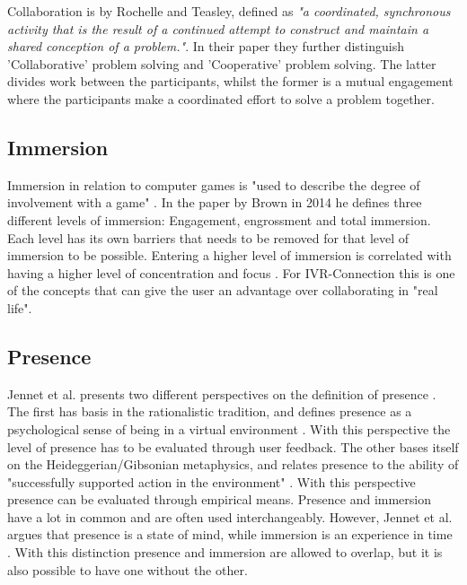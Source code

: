             Collaboration is by Rochelle and Teasley, defined as \emph{"a coordinated, synchronous activity that is the result of a continued attempt to construct and maintain a shared conception of a problem."}\cite{Roschelle1995}. In their paper they further distinguish 'Collaborative' problem solving and 'Cooperative' problem solving. The latter divides work between the participants, whilst the former is a mutual engagement where the participants make a coordinated effort to solve a problem together. \cite{Roschelle1995}
            
        \subsection{Immersion} %
            Immersion in relation to computer games is "used to describe the degree of involvement with a game" \cite{Brown2004}. In the paper by Brown in 2014 he defines three different levels of immersion: Engagement, engrossment and total immersion. Each level has its own barriers that needs to be removed for that level of immersion to be possible. Entering a higher level of immersion is correlated with having a higher level of concentration and focus \cite{Jennett2008}. For IVR-Connection this is one of the concepts that can give the user an advantage over collaborating in "real life".
        
        \subsection{Presence} %
            Jennet et al. presents two different perspectives on the definition of presence \cite{Jennett2008}. The first has basis in the rationalistic tradition, and defines presence as a psychological sense of being in a virtual environment \cite{Slater1994}. With this perspective the level of presence has to be evaluated through user feedback. The other bases itself on the Heideggerian/Gibsonian metaphysics, and relates presence to the ability of "successfully supported action in the environment" \cite{Zahorik1998}. With this perspective presence can be evaluated through empirical means. Presence and immersion have a lot in common and are often used interchangeably. However, Jennet et al. argues that presence is a state of mind, while immersion is an experience in time \cite{Jennett2008}. With this distinction presence and immersion are allowed to overlap, but it is also possible to have one without the other.
            

